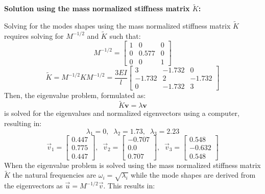 \documentclass[12pt,letter]{article}
\begin{document}
\begin{example}
	\noindent \textbf{Solution using the mass normalized stiffness matrix $\tilde{K}$:}

	
	\noindent 	Solving for the modes shapes using the  mass normalized stiffness matrix $\tilde{K}$ requires solving for $M^{-1/2}$ and $\tilde{K}$ such that:
	\begin{equation}
		  M^{-1/2} = \begin{bmatrix} 1 & 0 & 0 \\    0  & 0.577 & 0 \\ 0  & 0 & 1 \end{bmatrix}
	\end{equation}
	\begin{equation}
		   \tilde{K} = M^{-1/2} K M^{-1/2} = \frac{3EI}{l} \begin{bmatrix} 3 & -1.732 & 0 \\  -1.732  & 2 & -1.732 \\  0  & -1.732 & 3 \end{bmatrix} 
	\end{equation}
	Then, the eigenvalue problem, formulated as:
	\begin{equation}
	\tilde{K} \textbf{v} = \lambda \textbf{v}
	\end{equation}
	is solved for the eigenvalues and normalized eigenvectors using a computer, resulting in:
	\begin{equation}
	\lambda_1 = 0, \; \; \lambda_2 = 1.73, \; \; \lambda_3 = 2.23
	\end{equation}
	\begin{equation}
	\vec{v}_1 = \begin{bmatrix} 0.447 \\    0.775 \\    0.447  \end{bmatrix}, \; \; \vec{v}_2 = \begin{bmatrix} -0.707 \\    0.0 \\    0.707 \end{bmatrix}, \; \; \vec{v}_3 = \begin{bmatrix} 0.548 \\    -0.632 \\    0.548  \end{bmatrix}
	\end{equation}
	When the eigenvalue problem is solved using the mass normalized stiffness matrix $\tilde{K}$ the natural frequencies are $\omega_i = \sqrt{\lambda_i}$ while the mode shapes are derived from the eigenvectors as $\vec{u}=M^{-1/2}\vec{v}$. This results in:

\end{example}
\end{document}
